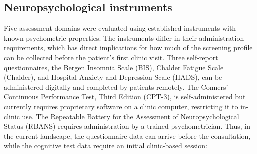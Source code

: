 \documentclass[11pt,a4paper]{article}
\begin{document}
\subsection{Neuropsychological instruments}

Five assessment domains were evaluated using established instruments with known psychometric properties. The instruments differ in their administration requirements, which has direct implications for how much of the screening profile can be collected before the patient's first clinic visit. Three self-report questionnaires, the Bergen Insomnia Scale (BIS), Chalder Fatigue Scale (Chalder), and Hospital Anxiety and Depression Scale (HADS), can be administered digitally and completed by patients remotely. The Conners' Continuous Performance Test, Third Edition (CPT-3), is self-administered but currently requires proprietary software on a clinic computer, restricting it to in-clinic use. The Repeatable Battery for the Assessment of Neuropsychological Status (RBANS) requires administration by a trained psychometrician. Thus, in the current landscape, the questionnaire data can arrive before the consultation, while the cognitive test data require an initial clinic-based session:
\end{document}
